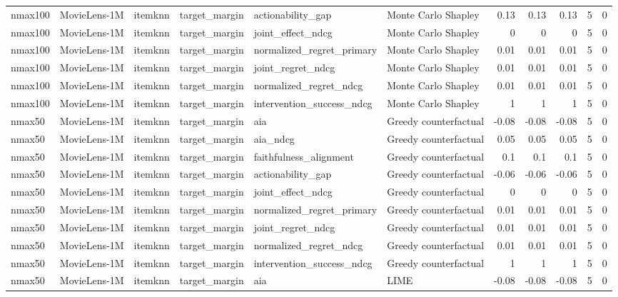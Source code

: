 \begin{table}[t]
{\begin{tabular}{llllllrrrrr}
nmax100 & MovieLens-1M & itemknn & target\_margin & actionability\_gap & Monte Carlo Shapley & 0.13 & 0.13 & 0.13 & 5 & 0 \\
nmax100 & MovieLens-1M & itemknn & target\_margin & joint\_effect\_ndcg & Monte Carlo Shapley & 0 & 0 & 0 & 5 & 0 \\
nmax100 & MovieLens-1M & itemknn & target\_margin & normalized\_regret\_primary & Monte Carlo Shapley & 0.01 & 0.01 & 0.01 & 5 & 0 \\
nmax100 & MovieLens-1M & itemknn & target\_margin & joint\_regret\_ndcg & Monte Carlo Shapley & 0.01 & 0.01 & 0.01 & 5 & 0 \\
nmax100 & MovieLens-1M & itemknn & target\_margin & normalized\_regret\_ndcg & Monte Carlo Shapley & 0.01 & 0.01 & 0.01 & 5 & 0 \\
nmax100 & MovieLens-1M & itemknn & target\_margin & intervention\_success\_ndcg & Monte Carlo Shapley & 1 & 1 & 1 & 5 & 0 \\
nmax50 & MovieLens-1M & itemknn & target\_margin & aia & Greedy counterfactual & -0.08 & -0.08 & -0.08 & 5 & 0 \\
nmax50 & MovieLens-1M & itemknn & target\_margin & aia\_ndcg & Greedy counterfactual & 0.05 & 0.05 & 0.05 & 5 & 0 \\
nmax50 & MovieLens-1M & itemknn & target\_margin & faithfulness\_alignment & Greedy counterfactual & 0.1 & 0.1 & 0.1 & 5 & 0 \\
nmax50 & MovieLens-1M & itemknn & target\_margin & actionability\_gap & Greedy counterfactual & -0.06 & -0.06 & -0.06 & 5 & 0 \\
nmax50 & MovieLens-1M & itemknn & target\_margin & joint\_effect\_ndcg & Greedy counterfactual & 0 & 0 & 0 & 5 & 0 \\
nmax50 & MovieLens-1M & itemknn & target\_margin & normalized\_regret\_primary & Greedy counterfactual & 0.01 & 0.01 & 0.01 & 5 & 0 \\
nmax50 & MovieLens-1M & itemknn & target\_margin & joint\_regret\_ndcg & Greedy counterfactual & 0.01 & 0.01 & 0.01 & 5 & 0 \\
nmax50 & MovieLens-1M & itemknn & target\_margin & normalized\_regret\_ndcg & Greedy counterfactual & 0.01 & 0.01 & 0.01 & 5 & 0 \\
nmax50 & MovieLens-1M & itemknn & target\_margin & intervention\_success\_ndcg & Greedy counterfactual & 1 & 1 & 1 & 5 & 0 \\
nmax50 & MovieLens-1M & itemknn & target\_margin & aia & LIME & -0.08 & -0.08 & -0.08 & 5 & 0 \\

\end{tabular}}
\end{table}
